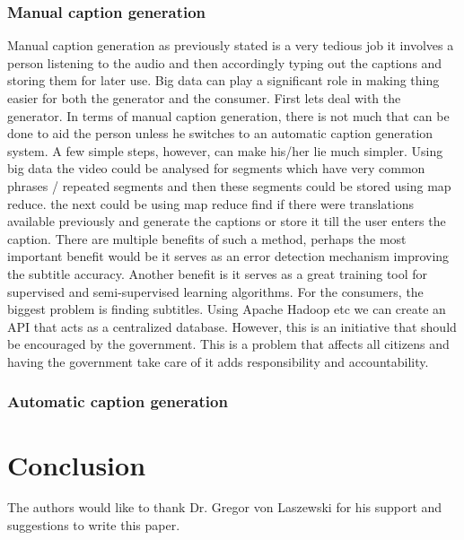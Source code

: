 \documentclass[sigconf]{acmart}
\begin{document}
\subsubsection{Manual caption generation}
Manual caption generation as previously stated is a very tedious job it involves a person listening to the audio and then accordingly typing out the captions and storing them for later use. Big data can play a significant role in making thing easier for both the generator and the consumer. First lets deal with the generator. In terms of manual caption generation, there is not much that can be done to aid the person unless he switches to an automatic caption generation system. A few simple steps, however, can make his/her lie much simpler. Using big data the video could be analysed for segments which have very common phrases / repeated segments and then these segments could be stored using map reduce. the next could be using map reduce find if there were translations available previously and generate the captions or store it till the user enters the caption. There are multiple benefits of such a method, perhaps the most important benefit would be it serves as an error detection mechanism improving the subtitle accuracy. Another benefit is it serves as a great training tool for supervised and semi-supervised learning algorithms. For the consumers, the biggest problem is finding subtitles. Using Apache Hadoop etc we can create an API that acts as a centralized database. However, this is an initiative that should be encouraged by the government. This is a problem that affects all citizens and having the government take care of it adds responsibility and accountability.

\subsubsection{Automatic caption generation}



\section{Conclusion}




\begin{acks}

  The authors would like to thank Dr. Gregor von Laszewski for his support and suggestions to write this paper.

\end{acks}


 
\end{document}
